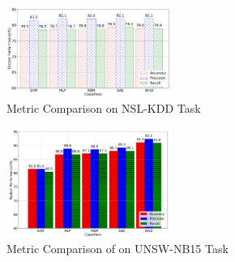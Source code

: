 \begin{figure}[h]
    \centering
    \includegraphics[width=0.48\textwidth]{figures/comp_accuracy_nsl.pdf}
    \caption{Metric Comparison on NSL-KDD Task}
    \label{Fig:CompAccuracyNSL}
\end{figure}

\begin{figure}[h]
    \centering
    \includegraphics[width=0.48\textwidth]{figures/comp_accuracy_unsw.pdf}
    \caption{Metric Comparison of  on UNSW-NB15 Task}
    \label{Fig:CompAccuracyUNSW}
\end{figure}

